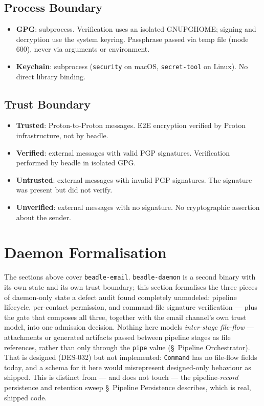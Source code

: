 \documentclass[a4paper,10pt,fleqn]{article}
\begin{document}
\subsection{Process Boundary}

\begin{itemize}
  \item \textbf{GPG}: subprocess. Verification uses an isolated
    GNUPGHOME; signing and decryption use the system keyring.
    Passphrase passed via temp file (mode 600), never via
    arguments or environment.
  \item \textbf{Keychain}: subprocess (\texttt{security} on macOS,
    \texttt{secret-tool} on Linux).  No direct library binding.
\end{itemize}

\subsection{Trust Boundary}

\begin{itemize}
  \item \textbf{Trusted}: Proton-to-Proton messages.  E2E
    encryption verified by Proton infrastructure, not by beadle.
  \item \textbf{Verified}: external messages with valid PGP
    signatures.  Verification performed by beadle in isolated GPG.
  \item \textbf{Untrusted}: external messages with invalid PGP
    signatures.  The signature was present but did not verify.
  \item \textbf{Unverified}: external messages with no signature.
    No cryptographic assertion about the sender.
\end{itemize}

\section{Daemon Formalisation}

The sections above cover \texttt{beadle-email}.  \texttt{beadle-daemon}
is a second binary with its own state and its own trust boundary;
this section formalises the three pieces of daemon-only state a
defect audit found completely unmodeled: pipeline lifecycle,
per-contact permission, and command-file signature verification ---
plus the gate that composes all three, together with the email
channel's own trust model, into one admission decision.  Nothing
here models \emph{inter-stage file-flow} --- attachments or generated
artifacts passed between pipeline stages as file references, rather
than only through the \texttt{pipe} value (\S~Pipeline Orchestrator).
That is designed (DES-032) but not implemented: \texttt{Command} has
no file-flow fields today, and a schema for it here would
misrepresent designed-only behaviour as shipped.  This is distinct
from --- and does not touch --- the pipeline-\emph{record} persistence
and retention sweep \S~Pipeline Persistence describes, which is real,
shipped code.
\end{document}
